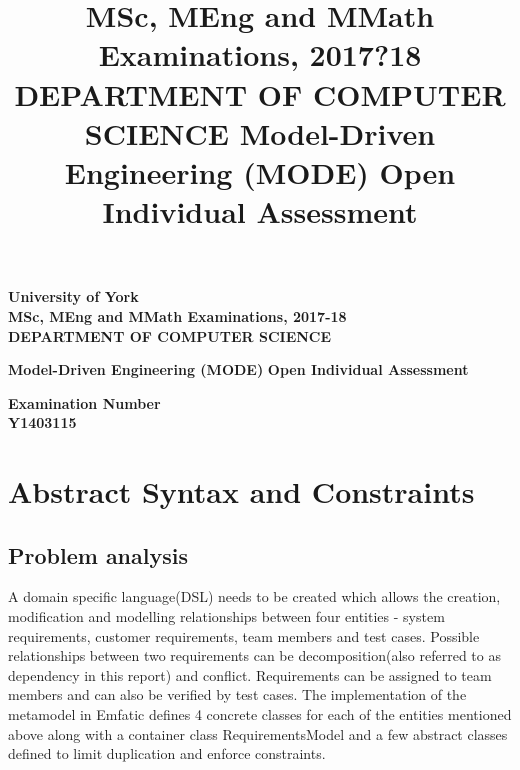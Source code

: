 \documentclass[11pt,a4paper]{scrartcl}
\title{MSc, MEng and MMath Examinations, 2017?18
	DEPARTMENT OF COMPUTER SCIENCE
	Model-Driven Engineering (MODE)
	Open Individual Assessment}
\date{}
\begin{document}
	
	\begin{titlepage}
		\begin{center}
			
			\large
			\textbf{University of York} \\
			\vspace{0.2cm}
			\textbf{MSc, MEng and MMath Examinations, 2017-18} \\
			\vspace{0.2cm}
			\textbf{DEPARTMENT OF COMPUTER SCIENCE} \\
			
			\vspace{2cm}
			
			\huge
			\textbf{Model-Driven Engineering (MODE)} 
			\textbf{Open Individual Assessment} \\
			
			\vspace{2cm}
			
			\Large
			\textbf{Examination Number} \\
			\textbf{Y1403115}
			
		\end{center}
	\end{titlepage}
	
	


\section{Abstract Syntax and Constraints}

	\subsection{Problem analysis}
	A domain specific language(DSL) needs to be created which allows the creation, modification and modelling relationships between four entities - system requirements, customer requirements, team members and test cases. Possible relationships between two requirements can be decomposition(also referred to as dependency in this report) and conflict. Requirements can be assigned to team members and can also be verified by test cases. 
	The implementation of the metamodel in Emfatic defines 4 concrete classes for each of the entities mentioned above along with a container class RequirementsModel and a few abstract classes defined to limit duplication and enforce constraints.
	
\end{document}
